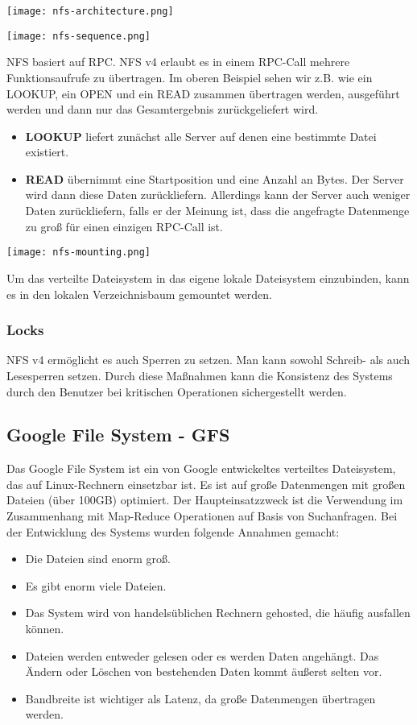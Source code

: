 \texttt{[image: nfs-architecture.png]}


\texttt{[image: nfs-sequence.png]}

NFS basiert auf RPC. NFS v4 erlaubt es in einem RPC-Call mehrere Funktionsaufrufe zu übertragen. Im oberen Beispiel sehen wir z.B. wie ein LOOKUP, ein OPEN und ein READ zusammen übertragen werden, ausgeführt werden und dann nur das Gesamtergebnis zurückgeliefert wird.
\begin{itemize}
    \item \textbf{LOOKUP} liefert zunächst alle Server auf denen eine bestimmte Datei existiert.
    \item \textbf{READ} übernimmt eine Startposition und eine Anzahl an Bytes. Der Server wird dann diese Daten zurückliefern. Allerdings kann der Server auch weniger Daten zurückliefern, falls er der Meinung ist, dass die angefragte Datenmenge zu groß für einen einzigen RPC-Call ist.
\end{itemize}

\texttt{[image: nfs-mounting.png]}

Um das verteilte Dateisystem in das eigene lokale Dateisystem einzubinden, kann es in den lokalen Verzeichnisbaum gemountet werden.

\subsubsection*{Locks}

NFS v4 ermöglicht es auch Sperren zu setzen. Man kann sowohl Schreib- als auch Lesesperren setzen. Durch diese Maßnahmen kann die Konsistenz des Systems durch den Benutzer bei kritischen Operationen sichergestellt werden.

\subsection{Google File System - GFS}
\label{sec:gfs}

Das Google File System ist ein von Google entwickeltes verteiltes Dateisystem, das auf Linux-Rechnern einsetzbar ist. Es ist auf große Datenmengen mit großen Dateien (über 100GB) optimiert. Der Haupteinsatzzweck ist die Verwendung im Zusammenhang mit Map-Reduce Operationen auf Basis von Suchanfragen. Bei der Entwicklung des Systems wurden folgende Annahmen gemacht:
\begin{itemize}
    \item Die Dateien sind enorm groß.
    \item Es gibt enorm viele Dateien.
    \item Das System wird von handelsüblichen Rechnern gehosted, die häufig ausfallen können.
    \item Dateien werden entweder gelesen oder es werden Daten angehängt. Das Ändern oder Löschen von bestehenden Daten kommt äußerst selten vor.
    \item Bandbreite ist wichtiger als Latenz, da große Datenmengen übertragen werden.
\end{itemize}

